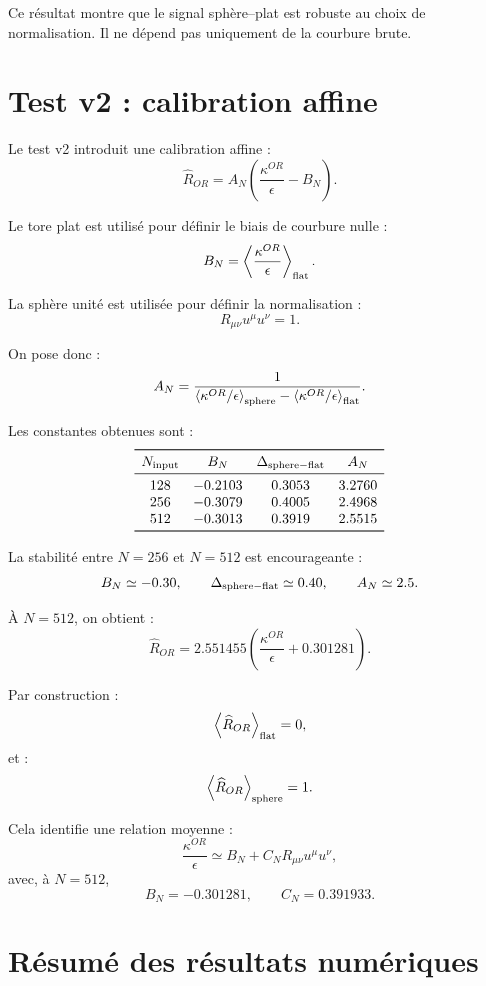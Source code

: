 \documentclass[11pt,a4paper]{article}
\begin{document}
Ce résultat montre que le signal sphère--plat est robuste au choix de
normalisation. Il ne dépend pas uniquement de la courbure brute.

\section{Test v2 : calibration affine}

Le test v2 introduit une calibration affine :
\[
\widehat{R}_{OR}
=
A_N
\left(
\frac{\kappa^{OR}}{\epsilon}
-
B_N
\right).
\]

Le tore plat est utilisé pour définir le biais de courbure nulle :
\[
B_N
=
\left\langle
\frac{\kappa^{OR}}{\epsilon}
\right\rangle_{\rm flat}.
\]

La sphère unité est utilisée pour définir la normalisation :
\[
R_{\mu\nu}u^\mu u^\nu=1.
\]

On pose donc :
\[
A_N=
\frac{1}{
\left\langle\kappa^{OR}/\epsilon\right\rangle_{\rm sphere}
-
\left\langle\kappa^{OR}/\epsilon\right\rangle_{\rm flat}
}.
\]

Les constantes obtenues sont :
\[
\begin{array}{cccc}
\toprule
N_{\rm input} & B_N & \Delta_{\rm sphere-flat} & A_N\\
\midrule
128 & -0.2103 & 0.3053 & 3.2760\\
256 & -0.3079 & 0.4005 & 2.4968\\
512 & -0.3013 & 0.3919 & 2.5515\\
\bottomrule
\end{array}
\]

La stabilité entre \(N=256\) et \(N=512\) est encourageante :
\[
B_N\simeq -0.30,
\qquad
\Delta_{\rm sphere-flat}\simeq0.40,
\qquad
A_N\simeq2.5.
\]

À \(N=512\), on obtient :
\[
\widehat{R}_{OR}
=
2.551455
\left(
\frac{\kappa^{OR}}{\epsilon}
+
0.301281
\right).
\]

Par construction :
\[
\left\langle
\widehat{R}_{OR}
\right\rangle_{\rm flat}
=
0,
\]
et :
\[
\left\langle
\widehat{R}_{OR}
\right\rangle_{\rm sphere}
=
1.
\]

Cela identifie une relation moyenne :
\[
\frac{\kappa^{OR}}{\epsilon}
\simeq
B_N+C_N R_{\mu\nu}u^\mu u^\nu,
\]
avec, à \(N=512\),
\[
B_N=-0.301281,
\qquad
C_N=0.391933.
\]

\section{Résumé des résultats numériques}
\end{document}
